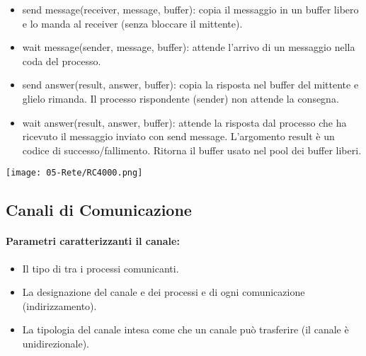 \begin{itemize}
	\item send message(receiver, message, buffer): copia il messaggio in un buffer libero e lo manda al receiver (senza bloccare il mittente).
	\item wait message(sender, message, buffer): attende l’arrivo di un messaggio nella coda del processo.
	\item send answer(result, answer, buffer): copia la risposta nel buffer del mittente e glielo rimanda. Il processo rispondente (sender) non attende la consegna.
	\item wait answer(result, answer, buffer): attende la risposta dal processo che ha ricevuto il messaggio inviato con send message. L’argomento result è un codice di successo/fallimento. Ritorna il buffer usato nel pool dei buffer liberi.
\end{itemize}

\begin{center}
	\texttt{[image: 05-Rete/RC4000.png]}
\end{center}




\subsection{Canali di Comunicazione}



\paragraph{Parametri caratterizzanti il canale:}

\begin{itemize}
	\item Il tipo di  tra i processi comunicanti.
	\item La designazione del canale e dei processi  e  di ogni comunicazione (indirizzamento).
	\item La tipologia del canale intesa come  che un canale può trasferire (il canale è unidirezionale).
\end{itemize}

